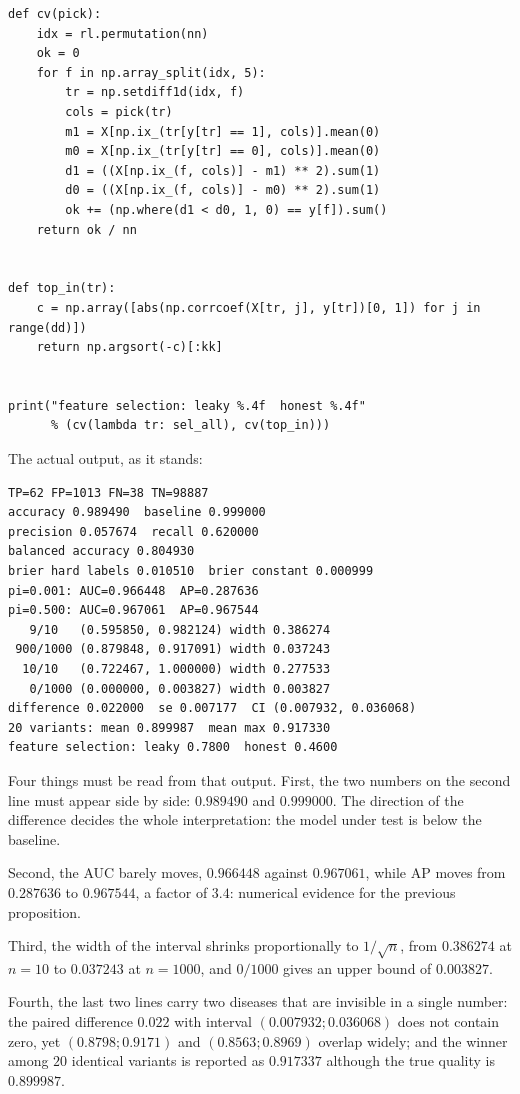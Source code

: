 \begin{lab}
\begin{verbatim}
def cv(pick):
    idx = rl.permutation(nn)
    ok = 0
    for f in np.array_split(idx, 5):
        tr = np.setdiff1d(idx, f)
        cols = pick(tr)
        m1 = X[np.ix_(tr[y[tr] == 1], cols)].mean(0)
        m0 = X[np.ix_(tr[y[tr] == 0], cols)].mean(0)
        d1 = ((X[np.ix_(f, cols)] - m1) ** 2).sum(1)
        d0 = ((X[np.ix_(f, cols)] - m0) ** 2).sum(1)
        ok += (np.where(d1 < d0, 1, 0) == y[f]).sum()
    return ok / nn


def top_in(tr):
    c = np.array([abs(np.corrcoef(X[tr, j], y[tr])[0, 1]) for j in range(dd)])
    return np.argsort(-c)[:kk]


print("feature selection: leaky %.4f  honest %.4f"
      % (cv(lambda tr: sel_all), cv(top_in)))
\end{verbatim}
\end{lab}

The actual output, as it stands:

\begin{verbatim}
TP=62 FP=1013 FN=38 TN=98887
accuracy 0.989490  baseline 0.999000
precision 0.057674  recall 0.620000
balanced accuracy 0.804930
brier hard labels 0.010510  brier constant 0.000999
pi=0.001: AUC=0.966448  AP=0.287636
pi=0.500: AUC=0.967061  AP=0.967544
   9/10   (0.595850, 0.982124) width 0.386274
 900/1000 (0.879848, 0.917091) width 0.037243
  10/10   (0.722467, 1.000000) width 0.277533
   0/1000 (0.000000, 0.003827) width 0.003827
difference 0.022000  se 0.007177  CI (0.007932, 0.036068)
20 variants: mean 0.899987  mean max 0.917330
feature selection: leaky 0.7800  honest 0.4600
\end{verbatim}

Four things must be read from that output. First, the two numbers on the second line must appear
side by side: $0.989490$ and $0.999000$. The direction of the difference decides the whole
interpretation: the model under test is below the baseline.

Second, the AUC barely moves, $0.966448$ against $0.967061$, while AP moves from $0.287636$ to
$0.967544$, a factor of $3.4$: numerical evidence for the previous proposition.

Third, the width of the interval shrinks proportionally to $1/\sqrt n$, from $0.386274$ at $n=10$ to
$0.037243$ at $n=1000$, and $0/1000$ gives an upper bound of $0.003827$.

Fourth, the last two lines carry two diseases that are invisible in a single number: the paired
difference $0.022$ with interval $(0.007932;0.036068)$ does not contain zero, yet
$(0.8798;0.9171)$ and $(0.8563;0.8969)$ overlap widely; and the winner among $20$ identical
variants is reported as $0.917337$ although the true quality is $0.899987$.

